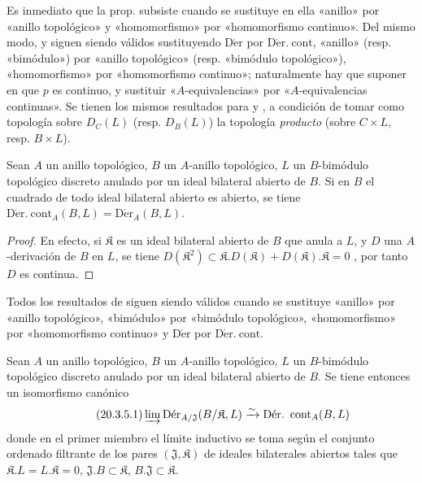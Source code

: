 \begin{env}[20.3.2]
\label{0.20.3.2-fr}
Es inmediato que la prop.  subsiste cuando se sustituye en ella
«anillo» por «anillo topológico» y «homomorfismo» por
«homomorfismo continuo». Del mismo modo,  y
 siguen siendo válidos sustituyendo $\operatorname{D\acute{e}r}$ por
$\operatorname{D\acute{e}r.\ cont}$, «anillo» (resp. «bimódulo») por «anillo
topológico» (resp. «bimódulo topológico»), «homomorfismo» por
«homomorfismo continuo»; naturalmente hay que suponer en
 que $p$ es continuo, y sustituir «$A$-equivalencias» por
«$A$-equivalencias continuas». Se tienen los mismos resultados para
 y , a condición de tomar como
topología sobre $D_C(L)$ (resp. $D_B(L)$) la topología \emph{producto} (sobre
$C\times L$, resp. $B\times L$).
\end{env}

\begin{proposition}[20.3.3]
\label{0.20.3.3-fr}
Sean $A$ un anillo topológico, $B$ un $A$-anillo topológico, $L$ un
$B$-bimódulo topológico discreto anulado por un ideal bilateral abierto de $B$.
Si en $B$ el cuadrado de todo ideal bilateral abierto es abierto, se tiene
$\operatorname{D\acute{e}r.\ cont}_A(B,L)=\operatorname{D\acute{e}r}_A(B,L)$.
\end{proposition}

\begin{proof}
En efecto, si $\mathfrak{K}$ es un ideal bilateral abierto de $B$ que anula a $L$,
y $D$ una $A$-derivación de $B$ en $L$, se tiene
$D(\mathfrak{K}^2)\subset\mathfrak{K}.D(\mathfrak{K})+
D(\mathfrak{K}).\mathfrak{K}=0$ , por tanto $D$ es continua.
\end{proof}

\begin{env}[20.3.4]
\label{0.20.3.4-fr}
Todos los resultados de  siguen siendo válidos cuando se sustituye
«anillo» por «anillo topológico», «bimódulo» por «bimódulo
topológico», «homomorfismo» por «homomorfismo continuo» y
$\operatorname{D\acute{e}r}$ por $\operatorname{D\acute{e}r.\ cont}$.
\end{env}

\begin{proposition}[20.3.5]
\label{0.20.3.5-fr}
Sean $A$ un anillo topológico, $B$ un $A$-anillo topológico, $L$ un
$B$-bimódulo topológico discreto anulado por un ideal bilateral abierto de $B$.
Se tiene entonces un isomorfismo canónico
\begin{equation}
\tag{20.3.5.1}
\label{0.20.3.5.1-fr}
  \varinjlim\operatorname{D\acute{e}r}_{A/\mathfrak{J}}
  (B/\mathfrak{K},L)\xrightarrow{\sim}
  \operatorname{D\acute{e}r.\ cont}_A(B,L)
\end{equation}
donde en el primer miembro el límite inductivo se toma según el conjunto
ordenado filtrante de los pares $(\mathfrak{J},\mathfrak{K})$ de ideales bilaterales abiertos
tales que $\mathfrak{K}.L=L.\mathfrak{K}=0$,
$\mathfrak{J}.B\subset\mathfrak{K}$,
$B.\mathfrak{J}\subset\mathfrak{K}$.
\end{proposition}

